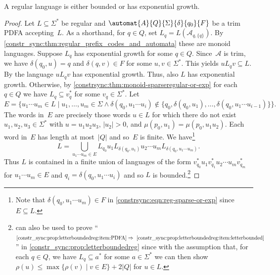\begin{theorem} \label{constrsync:thm:reg-sparse-or-exp}
	A regular language is either bounded or has exponential growth.
\end{theorem}
\begin{proof}	
	Let $L \subseteq \Sigma^*$ be regular and $\automat{A}{Q}{\Sigma}{\delta}{q_0}{F}$
	be a trim PDFA accepting~$L$.
	As a shorthand, for $q \in Q$, set $L_{q} = L(\mathcal A_{q, \{q\}})$.
	By \cref{constr_sync:thm:regular_prefix_codes_and_automata}
	these are monoid languages.	
	Suppose $L_q$ has exponential growth for some $q \in Q$.
	Since~$\mathcal A$ is trim, we have $\delta(q_0, u) = q$
	and $\delta(q, v) \in F$ for some $u,v \in \Sigma^*$.
	This yields $u L_q v \subseteq L$.
	By 
	the language $u L_q v$ has exponential growth.
	Thus, also $L$ has exponential growth.
	Otherwise, 
	by \cref{constrsync:thm:monoid-sparseregular-or-exp} 
	for each $q \in Q$ we have $L_q \subseteq v_q^*$
	for some $v_q \in \Sigma^*$.
	Let 
	\[
	E = \{ u_1 \cdots u_m \in L \mid u_1,\ldots,u_m \in \Sigma \land 
	\delta(q_0, u_1 \cdots u_i) \notin \{q_0, \delta(q_0, u_1), \ldots, \delta(q_0, u_1 \cdots u_{i-1}) \}
	\}.
	\]
	The words in~$E$ are precisely those
	words $u \in L$
	for which there do not exist $u_1, u_2, u_3 \in \Sigma^*$
	with $u = u_1 u_2 u_3$, $|u_2| > 0$, and $\mu(p_0, u_1) = \mu(p_0, u_1 u_2)$.
	Each word in~$E$ has length at most~$|Q|$ and so~$E$ is finite. 
	We have\footnote{Note that $\delta(q_0, u_1\cdots u_m) \in F$ in \cref{constrsync:eqn:reg-sparse-or-exp}
		since~$E \subseteq L$.}
	\begin{equation}\label{constrsync:eqn:reg-sparse-or-exp}
		L = \bigcup_{u_1 \cdots u_m \in E} L_{q_0} u_1 L_{\delta(q_0, u_1)} u_2
		\cdots u_m L_{\delta(q_0, u_1\cdots u_m)}.
	\end{equation}
	Thus $L$ is contained in a finite union	of languages of the form 
	$v_{q_0}^* u_1 v_{q_1}^* u_2 \cdots u_m v_{q_m}^*$
	for $u_1 \cdots u_m \in E$ and $q_i = \delta(q_0, u_1\cdots u_i)$ 
	and so $L$ is bounded.\footnote{ can also be used
	to prove ``$\ref{constr_sync:prop:letterboundedreg:item:PDFA} \Rightarrow~\ref{constr_sync:prop:letterboundedreg:item:letterbounded}$''
	in \cref{constr_sync:prop:letterboundedreg} since
	with the assumption that, for each $q \in Q$, we have $L_q \subseteq a^*$ for some $a \in \Sigma^*$
	we can then show $\rho(u) \le \max\{ \rho(v) \mid v \in E \} + 2|Q|$
	for $u \in L$.} 
\end{proof}

